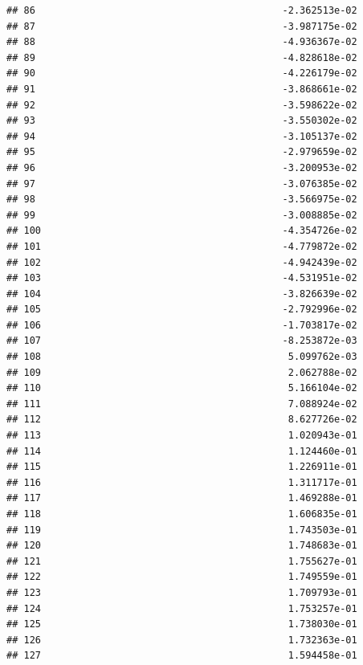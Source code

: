 \documentclass[
]{article}
\begin{document}
\begin{verbatim}
## 86                                           -2.362513e-02
## 87                                           -3.987175e-02
## 88                                           -4.936367e-02
## 89                                           -4.828618e-02
## 90                                           -4.226179e-02
## 91                                           -3.868661e-02
## 92                                           -3.598622e-02
## 93                                           -3.550302e-02
## 94                                           -3.105137e-02
## 95                                           -2.979659e-02
## 96                                           -3.200953e-02
## 97                                           -3.076385e-02
## 98                                           -3.566975e-02
## 99                                           -3.008885e-02
## 100                                          -4.354726e-02
## 101                                          -4.779872e-02
## 102                                          -4.942439e-02
## 103                                          -4.531951e-02
## 104                                          -3.826639e-02
## 105                                          -2.792996e-02
## 106                                          -1.703817e-02
## 107                                          -8.253872e-03
## 108                                           5.099762e-03
## 109                                           2.062788e-02
## 110                                           5.166104e-02
## 111                                           7.088924e-02
## 112                                           8.627726e-02
## 113                                           1.020943e-01
## 114                                           1.124460e-01
## 115                                           1.226911e-01
## 116                                           1.311717e-01
## 117                                           1.469288e-01
## 118                                           1.606835e-01
## 119                                           1.743503e-01
## 120                                           1.748683e-01
## 121                                           1.755627e-01
## 122                                           1.749559e-01
## 123                                           1.709793e-01
## 124                                           1.753257e-01
## 125                                           1.738030e-01
## 126                                           1.732363e-01
## 127                                           1.594458e-01

\end{verbatim}
\end{document}
